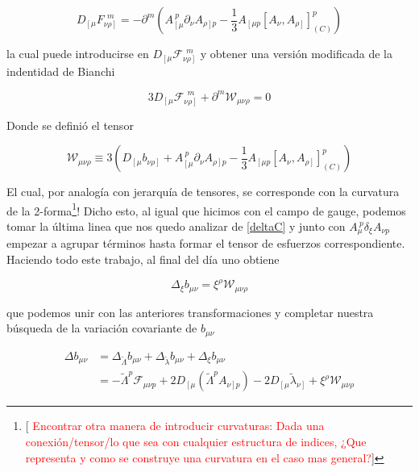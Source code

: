 \documentclass{article}
\numberwithin{equation}{section}
\begin{document}
\begin{equation}
D_{\left[ \mu \right.} F_{\left. \nu \rho \right]}^{\ \ m} = - \partial^m \left( A_{\left[ \mu\right.}^{\ p} \partial_{\nu} A_{\left. \rho \right] p } - \frac{1}{3} A_{\left[ \mu p \right.} \left[A_{\nu}, A_{\left.\rho\right]} \right]_{(C)}^p \right)
\end{equation}

la cual puede introducirse en $ D_{\left[ \mu \right.} \mathcal{F}_{\left. \nu \rho \right]}^{\ \ m} $ y obtener una versión modificada de la indentidad de Bianchi

\begin{equation}
3 D_{\left[ \mu \right.} \mathcal{F}_{\left. \nu \rho \right]}^{\ \ m} + \partial^m \mathcal{W}_{\mu \nu \rho} = 0
\end{equation}

Donde se definió el tensor

\begin{equation}\label{W}
\mathcal{W}_{\mu \nu \rho} \equiv 3 \left( D_{\left[ \mu \right.} b_{\left. \nu \rho \right]} + A_{\left[ \mu\right.}^{\ p} \partial_{\nu} A_{\left. \rho \right] p } - \frac{1}{3} A_{\left[ \mu p \right.} \left[A_{\nu}, A_{\left.\rho\right]} \right]_{(C)}^p\right)
\end{equation}

El cual, por analogía con jerarquía de tensores, se corresponde con la curvatura de la 2-forma\footnote{[\textcolor{red}{ Encontrar otra manera de introducir curvaturas: Dada una conexión/tensor/lo que sea con cualquier estructura de indices, ¿Que representa y como se construye una curvatura en el caso mas general?}]}! Dicho esto, al igual que hicimos con el campo de gauge, podemos tomar la última linea que nos quedo analizar de \ref{deltaC} y junto con $ A_{\mu}^{\ p} \delta_{\xi} A_{\nu p} $ empezar a agrupar términos hasta formar el tensor de esfuerzos correspondiente. Haciendo todo este trabajo, al final del día uno obtiene

\begin{equation}
\Delta_{\xi} b_{\mu \nu} = \xi^{\rho} \mathcal{W}_{\mu \nu \rho}
\end{equation}

que podemos unir con las anteriores transformaciones y completar nuestra búsqueda de la variación covariante de $ b_{\mu \nu} $

\begin{boxquation}
\begin{equation}
\begin{aligned}
\Delta b_{\mu \nu} &= \Delta_{\widetilde{\Lambda}} b_{\mu \nu} + \Delta_{\widetilde{\lambda}} b_{\mu \nu} + \Delta_{\xi} b_{\mu \nu}\\
&= -\widetilde{\Lambda}^p \mathcal{F}_{\mu \nu p} + 2 D_{\left[ \mu \right.} \left( \widetilde{\Lambda}^p A_{\left.\nu\right] p} \right) - 2 D_{\left[\mu \right.} \widetilde{\lambda}_{\left.\nu \right]} + \xi^{\rho} \mathcal{W}_{\mu \nu \rho}
\end{aligned}
\end{equation}
\end{boxquation}
\end{document}

